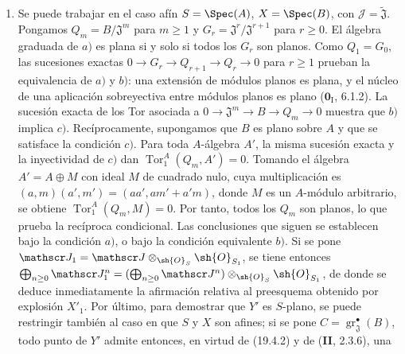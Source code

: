 \begin{enumerate}
  \item[(i)] Se puede trabajar en el caso afín $S=\Spec(A)$, $X=\Spec(B)$, con $\mathscr J=\widetilde{\mathfrak J}$. Pongamos $Q_m=B/\mathfrak J^m$ para $m\geq1$ y $G_r=\mathfrak J^r/\mathfrak J^{r+1}$ para $r\geq0$. El álgebra graduada de $a)$ es plana si y solo si todos los $G_r$ son planos. Como $Q_1=G_0$, las sucesiones exactas $0\to G_r\to Q_{r+1}\to Q_r\to0$ para $r\geq1$ prueban la equivalencia de $a)$ y $b)$: una extensión de módulos planos es plana, y el núcleo de una aplicación sobreyectiva entre módulos planos es plano ($\mathbf{0}_{\mathrm I}$, 6.1.2). La sucesión exacta de los Tor asociada a $0\to\mathfrak J^m\to B\to Q_m\to0$ muestra que $b)$ implica $c)$. Recíprocamente, supongamos que $B$ es plano sobre $A$ y que se satisface la condición $c)$. Para toda $A$-álgebra $A'$, la misma sucesión exacta y la inyectividad de $c)$ dan $\operatorname{Tor}_1^A(Q_m,A')=0$. Tomando el álgebra $A'=A\oplus M$ con ideal $M$ de cuadrado nulo, cuya multiplicación es $(a,m)(a',m')=(aa',am'+a'm)$, donde $M$ es un $A$-módulo arbitrario, se obtiene $\operatorname{Tor}_1^A(Q_m,M)=0$. Por tanto, todos los $Q_m$ son planos, lo que prueba la recíproca condicional. Las conclusiones que siguen se establecen bajo la condición $a)$, o bajo la condición equivalente $b)$. Si se pone $\mathscr J_1=\mathscr J\otimes_{\sh{O}_S}\sh{O}_{S_1}$, se tiene entonces $\bigoplus_{n\geq0}\mathscr J_1^n=(\bigoplus_{n\geq0}\mathscr J^n)\otimes_{\sh{O}_S}\sh{O}_{S_1}$, de donde se deduce inmediatamente la afirmación relativa al preesquema obtenido por explosión $X'_1$. Por último, para demostrar que $Y'$ es $S$-plano, se puede restringir también al caso en que $S$ y $X$ son afines; si se pone $C=\operatorname{gr}_{\mathfrak J}^\bullet(B)$, todo punto de $Y'$ admite entonces, en virtud de (19.4.2) y de (\textbf{II}, 2.3.6), una



\end{enumerate}
